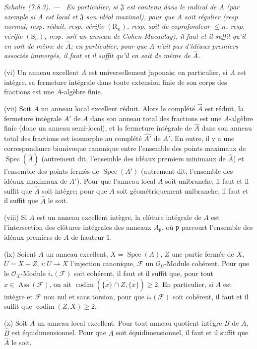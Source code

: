 \documentclass[10pt,oneside]{book}
\newcommand{\oldpage}[2][]{%
  \setcounter{footnote}{0}%
  \marginpar{\scriptsize\textbf{#1}~|~#2}\ignorespaces}
\newenvironment{scholium}[1][]{%
  \par\medskip\noindent\itshape Scholie (#1). ---\ }{\par}
\begin{document}
\begin{scholium}[7.8.3]
En particulier, si $\mathfrak J$ est contenu dans le radical de $A$ (par
exemple si $A$ est local et $\mathfrak J$ son idéal maximal), pour que $A$ soit
régulier (resp. normal, resp. réduit, resp. vérifie $(\mathrm R_n)$, resp. soit
de coprofondeur $\leq n$, resp. vérifie $(\mathrm S_n)$, resp. soit un anneau
de Cohen-Macaulay), il faut et il suffit qu'il en soit de même de $\widehat A$;
en particulier, pour que $A$ n'ait pas d'idéaux premiers associés immergés, il
faut et il suffit qu'il en soit de même de $\widehat A$.

(vi) Un anneau excellent $A$ est universellement japonais; en particulier, si
$A$ est intègre, sa fermeture intégrale dans toute extension finie de son corps
des fractions est une $A$-algèbre finie.

(vii) Soit $A$ un anneau local excellent réduit. Alors le complété $\widehat A$
est réduit, la fermeture intégrale $A'$ de $A$ dans son anneau total des
fractions est une $A$-algèbre finie (donc un anneau semi-local), et la fermeture
intégrale de $\widehat A$ dans son anneau total des fractions est isomorphe au
complété $\widehat {A'}$ de $A'$. En outre, il y a une correspondance biunivoque
canonique entre l'ensemble des points maximaux de
$\operatorname{Spec}(\widehat A)$ (autrement dit, l'ensemble des idéaux premiers
minimaux de $\widehat A$) et l'ensemble des points fermés de
$\operatorname{Spec}(A')$ (autrement dit, l'ensemble des idéaux maximaux de
$A'$). Pour que l'anneau local $A$ soit unibranche, il faut et il suffit que
$\widehat A$ soit intègre; pour que $A$ soit géométriquement unibranche, il faut
et il suffit que $\widehat A$ le soit.

(viii) Si $A$ est un anneau excellent intègre, la clôture intégrale de $A$ est
l'intersection des clôtures intégrales des anneaux $A_{\mathfrak p}$, où
$\mathfrak p$ parcourt l'ensemble des idéaux premiers de $A$ de hauteur $1$.

(ix) Soient $A$ un anneau excellent, $X=\operatorname{Spec}(A)$, $Z$ une partie
fermée de $X$, $U=X-Z$, $i:U\to X$ l'injection canonique, $\mathcal F$ un
$\mathcal O_U$-Module cohérent. Pour que le $\mathcal O_X$-Module
$i_*(\mathcal F)$ soit cohérent, il faut et il suffit que, pour tout
$x\in\operatorname{Ass}(\mathcal F)$, on ait
$\operatorname{codim}(\overline{\{x\}}\cap Z,\overline{\{x\}})\geq2$. En
particulier, si $A$ est intègre et $\mathcal F$ non nul et sans torsion, pour que
$i_*(\mathcal F)$ soit cohérent, il faut et il suffit que
$\operatorname{codim}(Z,X)\geq2$.

\oldpage[IV-2]{216}

(x) Soit $A$ un anneau local excellent. Pour tout anneau quotient intègre $B$
de $A$, $\widehat B$ est équidimensionnel. Pour que $A$ soit équidimensionnel,
il faut et il suffit que $\widehat A$ le soit.
\end{scholium}
\end{document}
